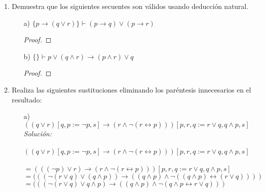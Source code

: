\documentclass[letterpaper,11pt]{article}
\begin{document}
\begin{enumerate}
        \item Demuestra que los siguientes secuentes son válidos usando
        deducción natural.
        \begin{itemize}

            \item[a)] $\{ p \rightarrow (q \lor r) \} \vdash
            (p \rightarrow q) \lor (p \rightarrow r)$
            \begin{proof}
                
            \end{proof}

            \item[b)] $\{ \} \vdash p \lor (q \land r) 
            \rightarrow (p \land r) \lor q$
            \begin{proof}
                
            \end{proof}
        
        \end{itemize}

        \item Realiza las siguientes sustituciones eliminando los paréntesis
        innecesarios en el resultado:
        \begin{itemize}
            
            \item[a)] $((q \lor r) [q, p := \neg p, s] 
            \rightarrow (r \land \neg (r \leftrightarrow p)))
            [p, r, q := r \lor q, q \land p, s]$ \\
            \textit{Solución: \\ \\}
            $((q \lor r) [q, p := \neg p, s] \rightarrow (r \land \neg (r \leftrightarrow p)))
            [p, r, q := r \lor q, q \land p, s] $ \\ \\
            $= (((\neg p) \lor r) \rightarrow (r \land \neg (r \leftrightarrow p)))
            [p, r, q := r \lor q, q \land p, s] $ \\
            $= (((\neg (r \lor q) \lor (q \land p)) \rightarrow 
            ((q \land p) \land \neg ((q \land p) \leftrightarrow (r \lor q))))$ \\
            $= (((\neg (r \lor q) \lor q \land p) \rightarrow
            ((q \land p) \land \neg (q \land p \leftrightarrow r \lor q)))$  
            

\end{itemize}
\end{enumerate}
\end{document}
